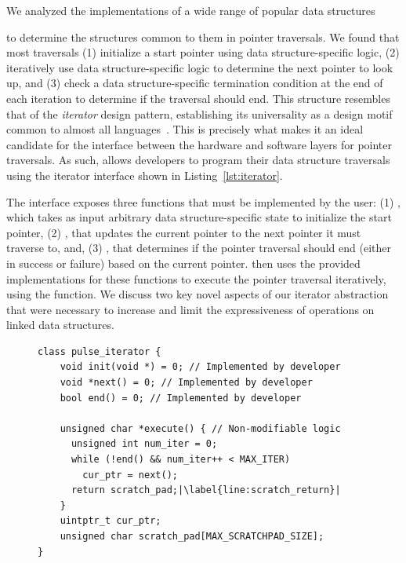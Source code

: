 We analyzed the implementations of a wide range of popular data structures~\cite{stl, boost, javaiterator, c++iterator} 

to determine the structures common to them in pointer traversals. We found that most traversals (1) initialize a start pointer using data structure-specific logic, (2) iteratively use data structure-specific logic to determine the next pointer to look up, and (3) check a data structure-specific termination condition at the end of each iteration to determine if the traversal should end. 
This structure resembles that of the \emph{iterator} design pattern, establishing its universality as a design motif common to almost all languages~\cite{javaiterator}. This is precisely what makes it an ideal candidate for the interface between the hardware and software layers for pointer traversals. As such, \pulse allows developers to program their data structure traversals using the iterator interface shown in Listing~\ref{lst:iterator}. 

The interface exposes three functions that must be implemented by the user: (1) , which takes as input arbitrary data structure-specific state to initialize the start pointer, (2) , that updates the current pointer to the next pointer it must traverse to, and, (3) , that determines if the pointer traversal should end (either in success or failure) based on the current pointer. \pulse then uses the provided implementations for these functions to execute the pointer traversal iteratively, using the  function. We discuss two key novel aspects of our iterator abstraction that were necessary to increase and limit the expressiveness of operations on linked data structures. 

\begin{figure}
\centering
\begin{lstlisting}[caption={\pulse interface.},label={lst:iterator},escapechar=|]
class pulse_iterator {
    void init(void *) = 0; // Implemented by developer
    void *next() = 0; // Implemented by developer
    bool end() = 0; // Implemented by developer
    
    unsigned char *execute() { // Non-modifiable logic
      unsigned int num_iter = 0;
      while (!end() && num_iter++ < MAX_ITER)
        cur_ptr = next();
      return scratch_pad;|\label{line:scratch_return}|
    }
    uintptr_t cur_ptr;
    unsigned char scratch_pad[MAX_SCRATCHPAD_SIZE];
}
\end{lstlisting}

\end{figure}

